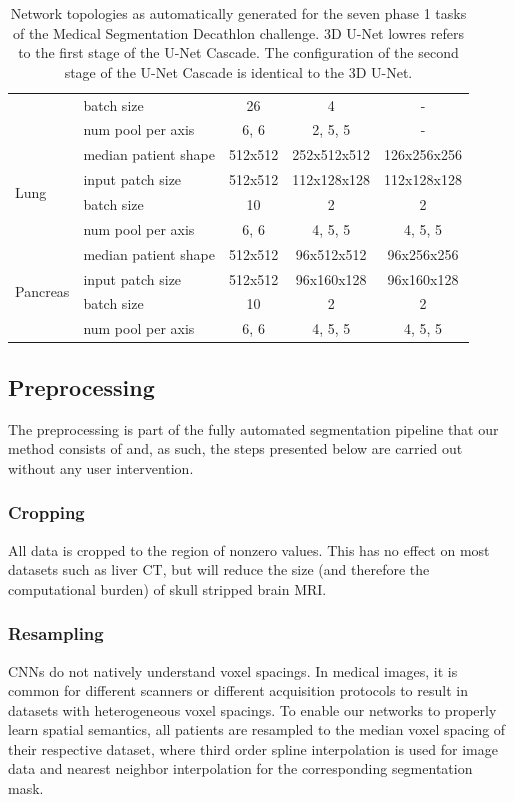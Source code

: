 \documentclass{templates/llncs} %
\begin{document}
\begin{table}[t]
\begin{tabular}{ll|ccc}
     & batch size & 26 & 4 & - \\
     & num pool per axis & 6, 6 & 2, 5, 5 & - \\
    \hline
    \multirow{4}{*}{Lung} & median patient shape & 512x512 & 252x512x512 & 126x256x256 \\
     & input patch size & 512x512 & 112x128x128 & 112x128x128 \\
     & batch size & 10 & 2 & 2 \\
     & num pool per axis & 6, 6 & 4, 5, 5 & 4, 5, 5 \\
    \hline
    \multirow{4}{*}{Pancreas} & median patient shape & 512x512 & 96x512x512 & 96x256x256 \\
     & input patch size & 512x512 & 96x160x128 & 96x160x128 \\
     & batch size & 10 & 2 & 2 \\
     & num pool per axis & 6, 6 & 4, 5, 5 & 4, 5, 5\\
     \hline
    \end{tabular}
    \caption{Network topologies as automatically generated for the seven phase 1 tasks of the Medical Segmentation Decathlon challenge. 3D U-Net lowres refers to the first stage of the U-Net Cascade. The configuration of the second stage of the U-Net Cascade is identical to the 3D U-Net.}
    \end{table}
    \subsection{Preprocessing}
    The preprocessing is part of the fully automated segmentation pipeline that our method consists of and, as such, the steps presented below are carried out without any user intervention. 
    
    \subsubsection{Cropping}
    All data is cropped to the region of nonzero values. This has no effect on most datasets such as liver CT, but will reduce the size (and therefore the computational burden) of skull stripped brain MRI. 
    
    \subsubsection{Resampling}
    \label{resampling}
    CNNs do not natively understand voxel spacings. In medical images, it is common for different scanners or different acquisition protocols to result in datasets with heterogeneous voxel spacings. To enable our networks to properly learn spatial semantics, all patients are resampled to the median voxel spacing of their respective dataset, where third order spline interpolation is used for image data and nearest neighbor interpolation for the corresponding segmentation mask.
    
\end{document}
